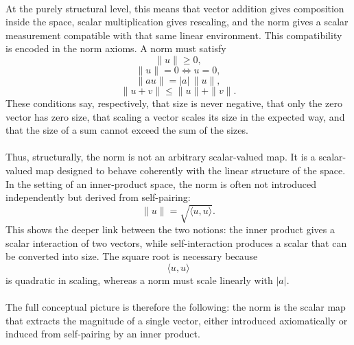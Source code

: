 \documentclass{article}
\begin{document}
	\paragraph{}
	At the purely structural level, this means that vector addition gives composition inside the space, scalar multiplication gives rescaling, and the norm gives a scalar measurement compatible with that same linear environment. This compatibility is encoded in the norm axioms. A norm must satisfy
	$$
	\|u\|\ge 0,
	$$
	$$
	\|u\|=0 \iff u=0,
	$$
	$$
	\|au\|=|a|\,\|u\|,
	$$
	$$
	\|u+v\|\le \|u\|+\|v\|.
	$$
	These conditions say, respectively, that size is never negative, that only the zero vector has zero size, that scaling a vector scales its size in the expected way, and that the size of a sum cannot exceed the sum of the sizes.
	
	\paragraph{}
	Thus, structurally, the norm is not an arbitrary scalar-valued map. It is a scalar-valued map designed to behave coherently with the linear structure of the space. In the setting of an inner-product space, the norm is often not introduced independently but derived from self-pairing:
	$$
	\|u\|=\sqrt{\langle u,u\rangle}.
	$$
	This shows the deeper link between the two notions: the inner product gives a scalar interaction of two vectors, while self-interaction produces a scalar that can be converted into size. The square root is necessary because
	$$
	\langle u,u\rangle
	$$
	is quadratic in scaling, whereas a norm must scale linearly with $|a|$.
	
	\paragraph{}
	The full conceptual picture is therefore the following: the norm is the scalar map that extracts the magnitude of a single vector, either introduced axiomatically or induced from self-pairing by an inner product.
	
\end{document}
